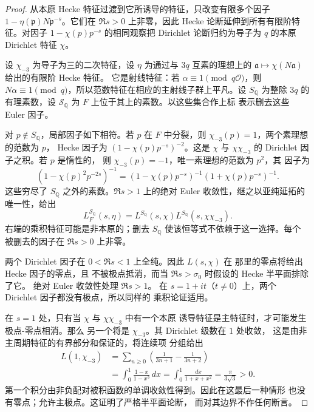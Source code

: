 \documentclass[11pt,a4paper]{article}
\numberwithin{equation}{section}
\numberwithin{figure}{section}
\theoremstyle{definition}
\theoremstyle{remark}
\begin{document}
\begin{proof}
从本原 Hecke 特征过渡到它所诱导的特征，只改变有限多个因子
$1-\eta(\mathfrak p)N\mathfrak p^{-s}$。它们在 $\Re s>0$ 上非零，因此 Hecke
论断延伸到所有有限阶特征。对因子
$1-\chi(p)p^{-s}$ 的相同观察把 Dirichlet 论断归约为导子为 $q$ 的本原
Dirichlet 特征 $\chi$。

设 $\chi_{-3}$ 为导子为三的二次特征，设
$\eta$ 为通过与 $3q$ 互素的理想上的
$\mathfrak a\mapsto\chi(N\mathfrak a)$ 给出的有限阶 Hecke 特征。
它是射线特征：若 $\alpha\equiv1\pmod{q\mathcal O}$，则
$N\alpha\equiv1\pmod q$，所以范数特征在相应的主射线子群上平凡。设 $S_{\mathbb Q}$ 为整除
$3q$ 的有理素数，设 $\mathcal S_{\mathbb Q}$ 为 $F$ 上位于其上的素数。以这些集合作上标
表示删去这些 Euler 因子。

对 $p\notin S_{\mathbb Q}$，局部因子如下相符。若 $p$
在 $F$ 中分裂，则 $\chi_{-3}(p)=1$，两个素理想的范数为 $p$，
Hecke 因子为 $(1-\chi(p)p^{-s})^{-2}$。这是
$\chi$ 与 $\chi\chi_{-3}$ 的 Dirichlet 因子之积。若 $p$ 是惰性的，
则 $\chi_{-3}(p)=-1$，唯一素理想的范数为 $p^2$，其
因子为
\[
 (1-\chi(p)^2p^{-2s})^{-1}
  =(1-\chi(p)p^{-s})^{-1}(1+\chi(p)p^{-s})^{-1}.
\]
这些穷尽了 $S_{\mathbb Q}$ 之外的素数。$\Re s>1$ 上的绝对 Euler
收敛性，继之以亚纯延拓的唯一性，给出
\begin{equation}
 L_F^{\mathcal S_{\mathbb Q}}(s,\eta)
 =L^{S_{\mathbb Q}}(s,\chi)
      L^{S_{\mathbb Q}}(s,\chi\chi_{-3}).
 \label{eq:hecke-dirichlet-factorization}
\end{equation}
右端的乘积特征可能是非本原的；删去
$S_{\mathbb Q}$ 使该恒等式不依赖于这一选择。每个
被删去的因子在 $\Re s>0$ 上非零。

两个 Dirichlet 因子在 $0<\Re s<1$ 上全纯。因此 $L(s,\chi)$ 在
那里的零点将给出 Hecke 因子的零点，且
不被极点抵消，而当 $\Re s>\sigma_0$ 时假设的 Hecke 半平面排除了它。
绝对 Euler 收敛性处理 $\Re s>1$。
在 $s=1+it$（$t\ne0$）上，两个 Dirichlet 因子都没有极点，所以同样的
乘积论证适用。

在 $s=1$ 处，只有当 $\chi$ 与 $\chi\chi_{-3}$ 中有一个本原
诱导特征是主特征时，才可能发生极点-零点相消。那么
另一个将是 $\chi_{-3}$。其 Dirichlet 级数在 $1$ 处收敛，
这是由非主周期特征的有界部分和保证的，将连续项
分组给出
\[
 \begin{split}
 L(1,\chi_{-3})
 &=\sum_{n\ge0}\left(\frac1{3n+1}-\frac1{3n+2}\right)\\
 &=\int_0^1\frac{1-x}{1-x^3}\,dx
   =\int_0^1\frac{dx}{1+x+x^2}
   =\frac{\pi}{3\sqrt3}>0.
 \end{split}
\]
第一个积分由非负配对被积函数的单调收敛性得到。因此在这最后一种情形
也没有零点；允许主极点。这证明了严格半平面论断，
而对其边界不作任何断言。
\end{proof}
\end{document}
